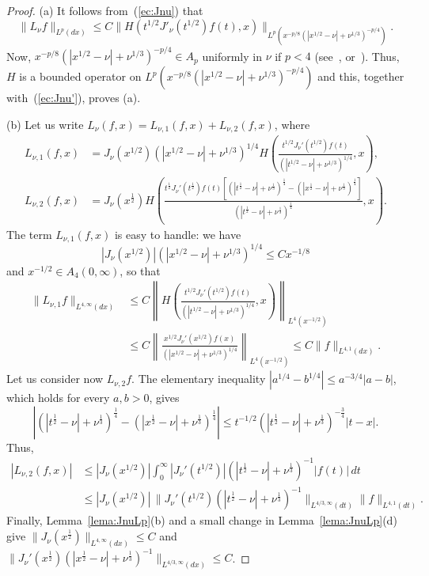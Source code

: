 \documentclass{amsart}
\theoremstyle{plain}
\begin{document}
\begin{proof}
(a) It follows from~(\ref{ec:Jnu}) that
\begin{equation*}
    \| L_\nu f \|_{L^p(dx)} \le C
    \| H(t^{1/2} J'_{\nu}(t^{1/2})f(t),x)
    \|_{L^p(x^{-p/8}(|x^{1/2}-\nu|+{\nu}^{1/3})^{-p/4})}.
\end{equation*}
Now, $x^{-p/8}(|x^{1/2}-\nu|+{\nu}^{1/3})^{-p/4} \in A_p$ uniformly in $\nu$
if $p<4$ (see~\cite{CGPV}, \cite{GPV2} or~\cite{V}). Thus, $H$ is a bounded
operator on $L^p(x^{-p/8}(|x^{1/2}-\nu|+{\nu}^{1/3})^{-p/4})$ and this,
together with~(\ref{ec:Jnu'}), proves (a).

(b) Let us write $L_\nu(f,x) = L_{\nu,1}(f,x) +
L_{\nu,2}(f,x)$, where
\begin{align*}
   L_{\nu,1}(f,x) 
   &= J_\nu(x^{1/2}) (|x^{1/2} - \nu| + \nu^{1/3})^{1/4}
   H \left(
   \frac{t^{1/2} J_\nu'(t^{1/2}) f(t)}{(|t^{1/2} - \nu| + \nu^{1/3})^{1/4}},
   x \right),
   \\
   L_{\nu,2}(f,x)
   &= J_\nu(x^\frac{1}{2}) H \left(
   \frac{t^\frac{1}{2} J_\nu'(t^\frac{1}{2}) f(t)
   [(|t^\frac{1}{2} - \nu| + \nu^\frac{1}{3})^\frac{1}{4} -
   (|x^\frac{1}{2} - \nu| + \nu^\frac{1}{3})^\frac{1}{4}]}
   {(|t^\frac{1}{2} -\nu| + \nu^\frac{1}{3})^\frac{1}{4}},
   x \right).
\end{align*}
The term $L_{\nu,1}(f,x)$ is easy to handle: we have
\[
   |J_\nu(x^{1/2})| (|x^{1/2} - \nu| + \nu^{1/3})^{1/4} \leq C x^{-1/8}
\]
and $x^{-1/2} \in A_4(0,\infty)$, so that
\begin{align*}
   \| L_{\nu,1}f \|_{L^{4,\infty}(dx)}
   &\leq C \left\| H \left(
   \frac{t^{1/2} J_\nu'(t^{1/2}) f(t)}{(|t^{1/2} - \nu| + \nu^{1/3})^{1/4}},
   x \right)
   \right\|_{L^4(x^{-1/2})}
   \\
   &\leq C \left\|
   \frac{x^{1/2} J_\nu'(x^{1/2}) f(x)}{(|x^{1/2} - \nu| + \nu^{1/3})^{1/4}}
   \right\|_{L^4(x^{-1/2})}
   \leq C \| f \|_{L^{4,1}(dx)}.
\end{align*}
Let us consider now $L_{\nu,2} f$. The elementary inequality $|a^{1/4} -
b^{1/4}| \leq a^{-3/4} |a - b|$, which holds for every $a, b > 0$, gives
\[
   \left|
   (|t^\frac{1}{2} - \nu| + \nu^\frac{1}{3})^\frac{1}{4} -
   (|x^\frac{1}{2} - \nu| + \nu^\frac{1}{3})^\frac{1}{4}
   \right|
   \leq t^{-1/2} (|t^\frac{1}{2} - \nu| + \nu^\frac{1}{3})^{-\frac{3}{4}}
   |t - x|.
\]
Thus,
\begin{align*}
   |L_{\nu,2}(f,x)|
   &\leq |J_\nu(x^{1/2})|
   \int_0^\infty |J_\nu'(t^{1/2})|
   (|t^\frac{1}{2} - \nu| + \nu^\frac{1}{3})^{-1} |f(t)| \, dt
   \\
   &\leq |J_\nu(x^{1/2})| \,
   \| J_\nu'(t^{1/2}) (|t^\frac{1}{2} - \nu| + \nu^\frac{1}{3})^{-1}
   \|_{L^{4/3,\infty}(dt)} \| f \|_{L^{4,1}(dt)}.
\end{align*}
Finally, Lemma~\ref{lema:JnuLp}(b) and a small change in
Lemma~\ref{lema:JnuLp}(d) give $\| J_\nu(x^\frac{1}{2})
\|_{L^{4,\infty}(dx)} \leq C$ and $\| J_\nu'(x^\frac{1}{2}) (|x^\frac{1}{2}
- \nu| + \nu^\frac{1}{3})^{-1} \|_{L^{4/3,\infty}(dx)} \leq C$.
\end{proof}
\end{document}
